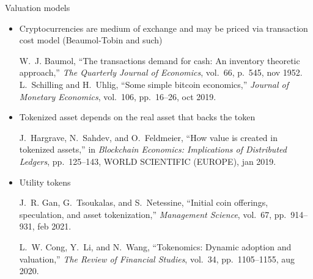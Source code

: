 \documentclass{beamer}
\begin{document}
\begin{frame}{Valuation models}
\begin{itemize}
\item Cryptocurrencies are medium of exchange and may be priced via transaction cost model (Beaumol-Tobin and such)

\scriptsize
\begin{thebibliography}{1}
W.~J. Baumol, ``The transactions demand for cash: An inventory theoretic
  approach,'' {\em The Quarterly Journal of Economics}, vol.~66, p.~545, nov
  1952.
L.~Schilling and H.~Uhlig, ``Some simple bitcoin economics,'' {\em Journal of
  Monetary Economics}, vol.~106, pp.~16--26, oct 2019.
\end{thebibliography}
\normalsize
\item Tokenized asset depends on the real asset that backs the token
\scriptsize
\begin{thebibliography}{1}

J.~Hargrave, N.~Sahdev, and O.~Feldmeier, ``How value is created in tokenized
  assets,'' in {\em Blockchain Economics: Implications of Distributed Ledgers},
  pp.~125--143, {WORLD} {SCIENTIFIC} ({EUROPE}), jan 2019.

\end{thebibliography}
\normalsize
\item Utility tokens
\scriptsize
\begin{thebibliography}{1}

J.~R. Gan, G.~Tsoukalas, and S.~Netessine, ``Initial coin offerings,
  speculation, and asset tokenization,'' {\em Management Science}, vol.~67,
  pp.~914--931, feb 2021.

L.~W. Cong, Y.~Li, and N.~Wang, ``Tokenomics: Dynamic adoption and valuation,''
  {\em The Review of Financial Studies}, vol.~34, pp.~1105--1155, aug 2020.

\end{thebibliography}

\end{itemize}
\end{frame}
\end{document}
